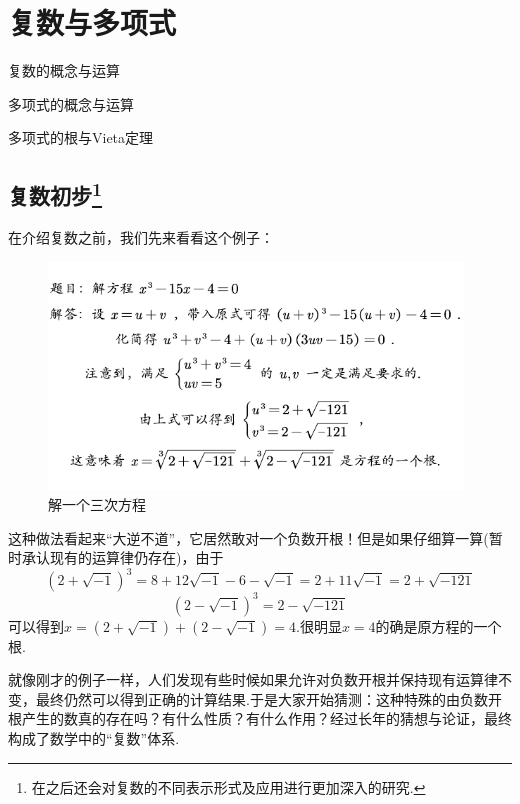 \documentclass[lang=cn, zihao=5]{elegantbook}
\begin{document}
\chapter{复数与多项式}

\begin{introduction}
	\item 复数的概念与运算
	\item 多项式的概念与运算
	\item 多项式的根与Vieta定理
\end{introduction}

\section{复数初步\footnote{在之后还会对复数的不同表示形式及应用进行更加深入的研究.}}

在介绍复数之前，我们先来看看这个例子：

\begin{figure}[H]
	\centering
	\includegraphics[width=11cm]{attachment/202304152fuuu.pdf}
	\caption{解一个三次方程}
\end{figure}

这种做法看起来“大逆不道”，它居然敢对一个负数开根！但是如果仔细算一算(暂时承认现有的运算律仍存在)，由于
$$(2+\sqrt{-1})^3 = 8 + 12\sqrt{-1} - 6 - \sqrt{-1} = 2+11\sqrt{-1}=2+\sqrt{-121}$$
$$(2-\sqrt{-1})^3 = 2-\sqrt{-121}$$
可以得到$x=(2+\sqrt{-1})+(2-\sqrt{-1})=4$.很明显$x=4$的确是原方程的一个根.

就像刚才的例子一样，人们发现有些时候如果允许对负数开根并保持现有运算律不变，最终仍然可以得到正确的计算结果.于是大家开始猜测：这种特殊的由负数开根产生的数真的存在吗？有什么性质？有什么作用？经过长年的猜想与论证，最终构成了数学中的“复数”体系.
\end{document}
